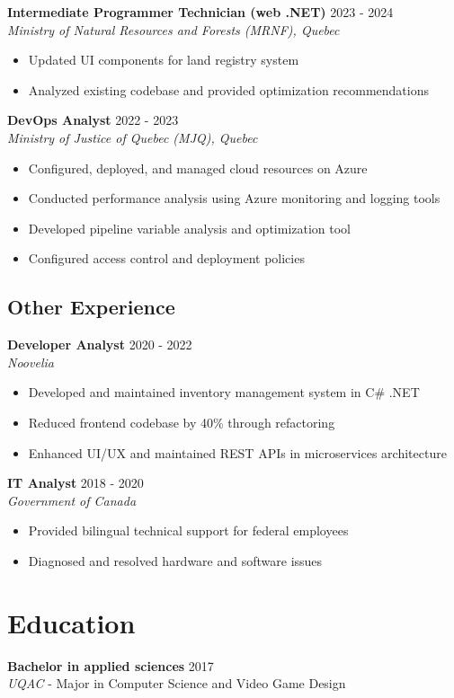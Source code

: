 ﻿\documentclass[11pt,letterpaper]{article}
\begin{document}
\newpage

\textbf{Intermediate Programmer Technician (web .NET)} \hfill 2023 - 2024\\
\textit{Ministry of Natural Resources and Forests (MRNF), Quebec}
\begin{itemize}
\item Updated UI components for land registry system
\item Analyzed existing codebase and provided optimization recommendations
\end{itemize}

\textbf{DevOps Analyst} \hfill 2022 - 2023\\
\textit{Ministry of Justice of Quebec (MJQ), Quebec}
\begin{itemize}
\item Configured, deployed, and managed cloud resources on Azure
\item Conducted performance analysis using Azure monitoring and logging tools
\item Developed pipeline variable analysis and optimization tool
\item Configured access control and deployment policies
\end{itemize}

\subsection*{Other Experience}

\textbf{Developer Analyst} \hfill 2020 - 2022\\
\textit{Noovelia}
\begin{itemize}
\item Developed and maintained inventory management system  in C\# .NET
\item Reduced frontend codebase by 40\% through refactoring
\item Enhanced UI/UX and maintained REST APIs in microservices architecture
\end{itemize}

\textbf{IT Analyst} \hfill 2018 - 2020\\
\textit{Government of Canada}
\begin{itemize}
\item Provided bilingual technical support for federal employees
\item Diagnosed and resolved hardware and software issues
\end{itemize}

\section*{Education}
\textbf{Bachelor in applied sciences} \hfill 2017\\
\textit{UQAC} - Major in Computer Science and Video Game Design
\end{document}
